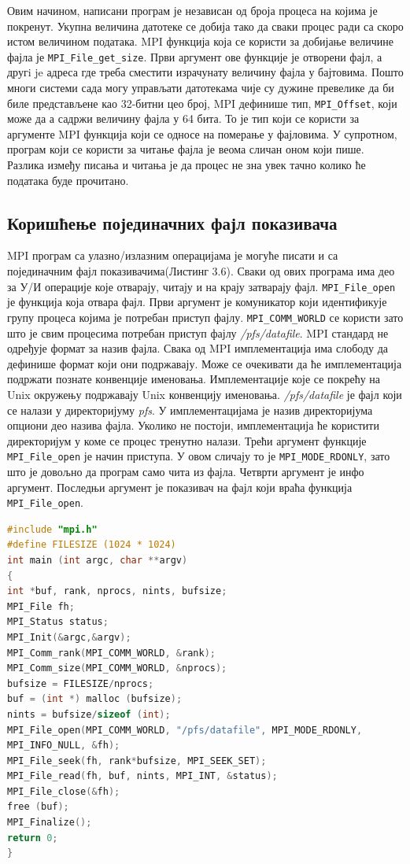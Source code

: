 Овим начином, написани програм је независан од броја процеса на којима је покренут. Укупна величина датотеке се добија тако да сваки процес ради са скоро истом величином података.
MPI функција која се користи за добијање величине фајла је  \texttt{MPI\_File\_get\_size}. Први аргумент ове функције је отворени фајл, а другi je адреса где треба сместити израчунату величину фајла у бајтовима. Пошто многи системи сада могу управљати датотекама чије су дужине превелике да би биле
представљене као 32-битни цео број, MPI дефинише тип,  \texttt{MPI\_Offset}, који може да а садржи величину фајла у 64 бита. 
То је тип који се користи 
за аргументе MPI функција који се односе на померање у фајловима. У супротном, програм који се користи за читање фајла је веома сличан оном који пише. Разлика између писања и читања је да процес не зна увек тачно колико ће података буде прочитано.

\subsection{Коришћење појединачних фајл показивача}

MPI програм са улазно/излазним операцијама је могуће писати и са појединачним фајл показивачима(Листинг 3.6). Сваки од ових програма има део за У/И операције које отварају, читају и на крају затварају фајл. \texttt{MPI\_File\_open} је функција која отвара фајл. Први аргумент је комуникатор који идентификује групу процеса којима је потребан приступ фајлу. \texttt{MPI\_COMM\_WORLD} се користи зато што је свим процесима потребан приступ фајлу \textit{/pfs/datafile}. MPI стандард не одређује формат за назив фајла. Свака од MPI имплементација има слободу да дефинише формат који они подржавају. Може се очекивати да ће имплементација подржати познате конвенције именовања. Имплементације које се покрећу на Unix окружењу подржавају Unix конвенцију именовања. \textit{/pfs/datafile} је фајл који се налази у директоријуму \textit{pfs}. У имплементацијама је назив директоријума опциони део назива фајла. Уколико не постоји, имплементација ће користити директоријум у коме се процес тренутно налази. Трећи аргумент функције \texttt{MPI\_File\_open} је начин приступа. У овом сличају то је \texttt{MPI\_MODE\_RDONLY}, зато што је довољно да програм само чита из фајла. Четврти аргумент је инфо аргумент. Последњи аргумент је показивач на фајл који враћа функција \texttt{MPI\_File\_open}.


\begin{lstlisting}[style=nonumbers,frame=single,language=C, caption= MPI програм са појединачним фајл показивачима]
#include "mpi.h"
#define FILESIZE (1024 * 1024)
int main (int argc, char **argv)
{
int *buf, rank, nprocs, nints, bufsize;
MPI_File fh;
MPI_Status status;
MPI_Init(&argc,&argv);
MPI_Comm_rank(MPI_COMM_WORLD, &rank);
MPI_Comm_size(MPI_COMM_WORLD, &nprocs);
bufsize = FILESIZE/nprocs;
buf = (int *) malloc (bufsize);
nints = bufsize/sizeof (int);
MPI_File_open(MPI_COMM_WORLD, "/pfs/datafile", MPI_MODE_RDONLY,
MPI_INFO_NULL, &fh);
MPI_File_seek(fh, rank*bufsize, MPI_SEEK_SET);
MPI_File_read(fh, buf, nints, MPI_INT, &status);
MPI_File_close(&fh);
free (buf);
MPI_Finalize();
return 0;
}
\end{lstlisting}

